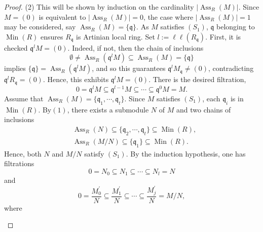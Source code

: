 \documentclass[11pt]{amsart}
\theoremstyle{plain}
\theoremstyle{definition}
\numberwithin{equation}{section}
\numberwithin{theorem}{section}
\begin{document}
\begin{proof}
    (2) This will be shown by induction on the cardinality $|\operatorname{Ass}_R(M)|$. Since $M= (0)$ is equivalent to $|\operatorname{Ass}_R(M)|=0$, the case where $|\operatorname{Ass}_R(M)|=1$ may be considered, say $\operatorname{Ass}_R(M)=\{\mathfrak{q}\}$. As $M$ satisfies $(S_1)$, $\mathfrak{q}$ belonging to $ \operatorname{Min}(R)$ ensures $R_{\mathfrak{q}}$ is Artinian local ring. Set $l:=\ell\ell(R_{\mathfrak{q}})$. First, it is checked $\mathfrak{q}^l M=(0)$. Indeed, if not, then the chain of inclusions
    \begin{displaymath}
        \emptyset \neq \operatorname{Ass}_R(\mathfrak{q}^l M)\subseteq \operatorname{Ass}_R(M)=\{\mathfrak{q}\}    
    \end{displaymath}
    implies $\{\mathfrak{q}\}=\operatorname{Ass}_R(\mathfrak{q}^l M)$, and so this guarantees $\mathfrak{q}^lM_{\mathfrak{q}}\neq (0)$, contradicting $\mathfrak{q}^lR_{\mathfrak{q}}=(0)$. Hence, this exhibits $\mathfrak{q}^l M=(0)$. There is the desired filtration, 
    \begin{displaymath}
        0=\mathfrak{q}^l M\subseteq \mathfrak{q}^{l-1}M\subseteq \cdots \subseteq \mathfrak{q}^0M=M.   
    \end{displaymath}
    Assume that $\operatorname{Ass}_R(M)=\{\mathfrak{q}_1,\cdots,\mathfrak{q}_t\}$. Since $M$ satisfies $(S_1)$, each $\mathfrak{q}_i$ is in $\operatorname{Min}(R)$.  By$(1)$, there exists a submodule $N$ of $M$ and  two chains of inclusions
    \begin{displaymath}
        \begin{aligned}
            &\operatorname{Ass}_R(N)\subseteq \{\mathfrak{q}_2,\cdots,\mathfrak{q}_t\}\subseteq \operatorname{Min}(R),
            \\& \operatorname{Ass}_R(M/N)\subseteq \{\mathfrak{q}_1\}\subseteq \operatorname{Min}(R).
        \end{aligned}
    \end{displaymath}
    Hence, both $N$ and $M/N$ satisfy $(S_1)$. By the induction hypothesis, one has filtrations 
    \begin{displaymath}
         0=N_0\subseteq N_1\subseteq \cdots \subseteq N_l=N
    \end{displaymath}
    and
    \begin{displaymath}
        0=\dfrac{M_0^\prime}{N}\subseteq \dfrac{M_1^\prime}{N}\subseteq \cdots \subseteq \dfrac{M_j^\prime}{N}=M/N,
    \end{displaymath}
    where
    \begin{enumerate}

\end{enumerate}
\end{proof}
\end{document}
